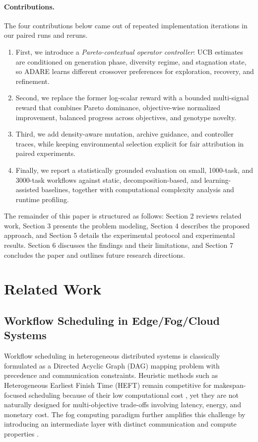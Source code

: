 \documentclass[preprint,12pt]{elsarticle}
\begin{document}
\paragraph{Contributions.}
The four contributions below came out of repeated implementation iterations in our paired runs and reruns.
\begin{enumerate}
    \item First, we introduce a \emph{Pareto-contextual operator controller}: UCB estimates are conditioned on generation phase, diversity regime, and stagnation state, so ADARE learns different crossover preferences for exploration, recovery, and refinement.
    \item Second, we replace the former log-scalar reward with a bounded multi-signal reward that combines Pareto dominance, objective-wise normalized improvement, balanced progress across objectives, and genotype novelty.
    \item Third, we add density-aware mutation, archive guidance, and controller traces, while keeping environmental selection explicit for fair attribution in paired experiments.
    \item Finally, we report a statistically grounded evaluation on small, 1000-task, and 3000-task workflows against static, decomposition-based, and learning-assisted baselines, together with computational complexity analysis and runtime profiling.
\end{enumerate}

The remainder of this paper is structured as follows: Section 2 reviews related work, Section 3 presents the problem modeling, Section 4 describes the proposed approach, and Section 5 details the experimental protocol and experimental results. Section 6 discusses the findings and their limitations, and Section 7 concludes the paper and outlines future research directions.

\section{Related Work}
\subsection{Workflow Scheduling in Edge/Fog/Cloud Systems}
Workflow scheduling in heterogeneous distributed systems is classically formulated as a Directed Acyclic Graph (DAG) mapping problem with precedence and communication constraints. Heuristic methods such as Heterogeneous Earliest Finish Time (HEFT) remain competitive for makespan-focused scheduling because of their low computational cost \cite{topcuoglu2002heft}, yet they are not naturally designed for multi-objective trade-offs involving latency, energy, and monetary cost. The fog computing paradigm further amplifies this challenge by introducing an intermediate layer with distinct communication and compute properties \cite{bonomi2012fog}.
\end{document}
